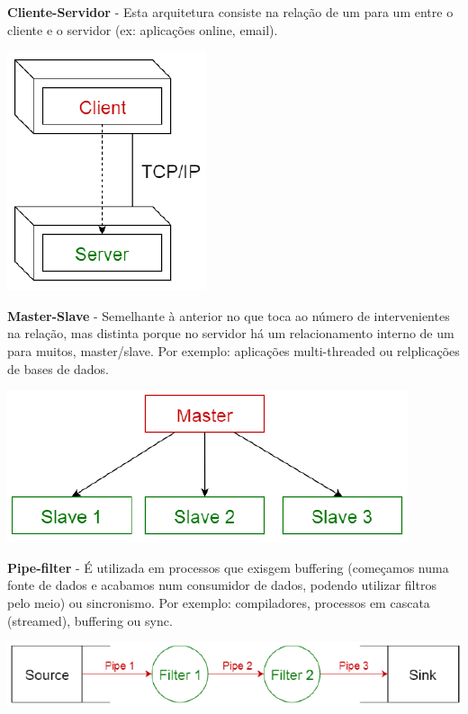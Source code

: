 \documentclass{article}
\begin{document}
 \begin{flushleft}
  \textbf{Cliente-Servidor} - Esta arquitetura consiste na relação
  de um para um entre o cliente e o servidor (ex: aplicações online, email).

  \begin{center}
    \includegraphics[scale=0.6]{57}
  \end{center}

  \textbf{Master-Slave} - Semelhante à anterior no que toca ao número de
  intervenientes na relação, mas distinta porque no servidor há um relacionamento
  interno de um para muitos, master/slave. Por exemplo:
  aplicações multi-threaded ou relplicações de bases de dados.

  \begin{center}
    \includegraphics[scale=0.6]{58}
  \end{center}

  \textbf{Pipe-filter} - É utilizada em processos que exisgem buffering
  (começamos numa fonte de dados e acabamos num consumidor de dados, podendo utilizar
  filtros pelo meio) ou sincronismo. Por exemplo: compiladores,
  processos em cascata (streamed), buffering ou sync.

  \begin{center}
    \includegraphics[scale=0.6]{59}
  \end{center}
 \end{flushleft}
\end{document}
